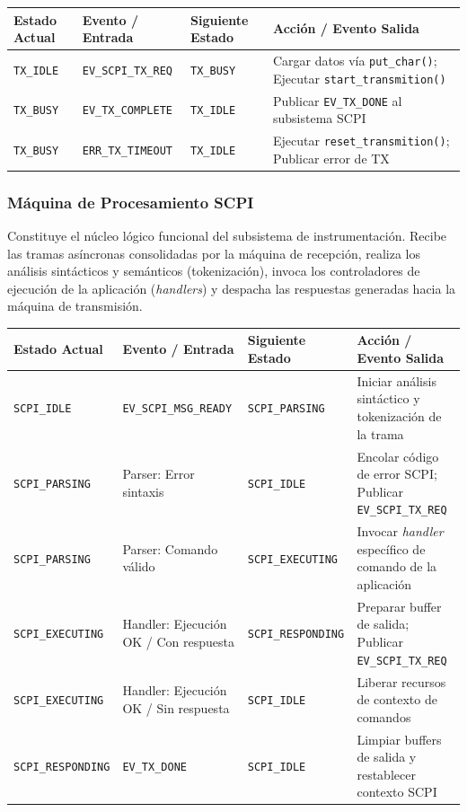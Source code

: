 \begin{center}
\small
\begin{tabular}{llll}
\toprule
\textbf{Estado Actual} & \textbf{Evento / Entrada} & \textbf{Siguiente Estado} & \textbf{Acción / Evento Salida} \\
\midrule
\texttt{TX\_IDLE} & \texttt{EV\_SCPI\_TX\_REQ} & \texttt{TX\_BUSY} & Cargar datos vía \texttt{put\_char()}; Ejecutar \texttt{start\_transmition()} \\
\texttt{TX\_BUSY} & \texttt{EV\_TX\_COMPLETE} & \texttt{TX\_IDLE} & Publicar \texttt{EV\_TX\_DONE} al subsistema SCPI \\
\texttt{TX\_BUSY} & \texttt{ERR\_TX\_TIMEOUT} & \texttt{TX\_IDLE} & Ejecutar \texttt{reset\_transmition()}; Publicar error de TX \\
\bottomrule
\end{tabular}
\end{center}

\subsubsection{Máquina de Procesamiento SCPI}
\label{subsubsec:fsm-procesamiento-scpi}

Constituye el núcleo lógico funcional del subsistema de instrumentación. Recibe las tramas asíncronas consolidadas por la máquina de recepción, realiza los análisis sintácticos y semánticos (tokenización), invoca los controladores de ejecución de la aplicación (\textit{handlers}) y despacha las respuestas generadas hacia la máquina de transmisión.

\begin{center}
\small
\begin{tabular}{llll}
\toprule
\textbf{Estado Actual} & \textbf{Evento / Entrada} & \textbf{Siguiente Estado} & \textbf{Acción / Evento Salida} \\
\midrule
\texttt{SCPI\_IDLE} & \texttt{EV\_SCPI\_MSG\_READY} & \texttt{SCPI\_PARSING} & Iniciar análisis sintáctico y tokenización de la trama \\
\texttt{SCPI\_PARSING} & Parser: Error sintaxis & \texttt{SCPI\_IDLE} & Encolar código de error SCPI; Publicar \texttt{EV\_SCPI\_TX\_REQ} \\
\texttt{SCPI\_PARSING} & Parser: Comando válido & \texttt{SCPI\_EXECUTING} & Invocar \textit{handler} específico de comando de la aplicación \\
\texttt{SCPI\_EXECUTING} & Handler: Ejecución OK / Con respuesta & \texttt{SCPI\_RESPONDING} & Preparar buffer de salida; Publicar \texttt{EV\_SCPI\_TX\_REQ} \\
\texttt{SCPI\_EXECUTING} & Handler: Ejecución OK / Sin respuesta & \texttt{SCPI\_IDLE} & Liberar recursos de contexto de comandos \\
\texttt{SCPI\_RESPONDING} & \texttt{EV\_TX\_DONE} & \texttt{SCPI\_IDLE} & Limpiar buffers de salida y restablecer contexto SCPI \\
\bottomrule
\end{tabular}
\end{center}

